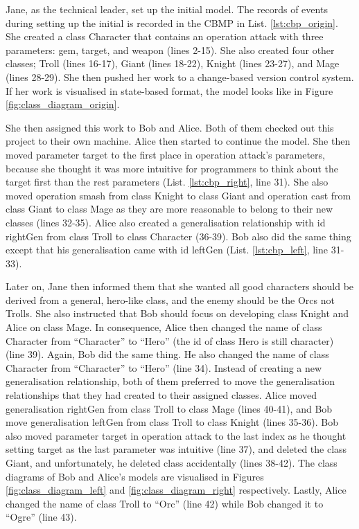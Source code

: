 Jane, as the technical leader, set up the initial model. The records of events during setting up the initial is recorded in the CBMP in List. \ref{lst:cbp_origin}. She created a class \textsf{Character} that contains an operation \textsf{attack} with three parameters: \textsf{gem}, \textsf{target}, and \textsf{weapon} (lines 2-15). She also created four other classes; \textsf{Troll} (lines 16-17), \textsf{Giant} (lines 18-22), \textsf{Knight} (lines 23-27), and \textsf{Mage} (lines 28-29). She then pushed her work to a change-based version control system. If her work is visualised in state-based format, the model looks like in Figure \ref{fig:class_diagram_origin}.

She then assigned this work to Bob and Alice. Both of them checked out this project to their own machine. Alice then started to continue the model. She then moved parameter \textsf{target} to the first place in operation \textsf{attack}'s parameters, because she thought it was more intuitive for programmers to think about the \textsf{target} first than the rest parameters (List. \ref{lst:cbp_right}, line 31). She also moved operation \textsf{smash} from class \textsf{Knight} to class \textsf{Giant} and operation \textsf{cast} from class \textsf{Giant} to class \textsf{Mage} as they are more reasonable to belong to their new classes (lines 32-35). Alice also created a generalisation relationship with id \textsf{rightGen} from class \textsf{Troll} to class \textsf{Character} (36-39). Bob also did the same thing except that his generalisation came with id \textsf{leftGen} (List. \ref{lst:cbp_left}, line 31-33). 

Later on, Jane then informed them that she wanted all good characters should be derived from a general, hero-like class, and the enemy should be the Orcs not Trolls. She also instructed that Bob should focus on developing class \textsf{Knight} and Alice on class \textsf{Mage}. In consequence, Alice then changed the name of class \textsf{Character} from ``Character'' to ``Hero'' (the id of class \textsf{Hero} is still \textsf{character}) (line 39). Again, Bob did the same thing. He also changed the name of class \textsf{Character} from ``Character'' to ``Hero'' (line 34). Instead of creating a new generalisation relationship, both of them preferred to move the generalisation relationships that they had created to their assigned classes. Alice moved generalisation \textsf{rightGen} from class \textsf{Troll} to class \textsf{Mage} (lines 40-41), and Bob move generalisation \textsf{leftGen} from class \textsf{Troll} to class \textsf{Knight} (lines 35-36). Bob also moved parameter \textsf{target} in operation \textsf{attack} to the last index as he thought setting target as the last parameter was intuitive (line 37), and deleted the class {Giant}, and unfortunately, he deleted class  accidentally (lines 38-42). The class diagrams of Bob and Alice's models are visualised in Figures \ref{fig:class_diagram_left} and \ref{fig:class_diagram_right} respectively. Lastly, Alice changed the \textsf{name} of class \textsf{Troll} to ``Orc'' (line 42) while Bob changed it to ``Ogre'' (line 43).  

